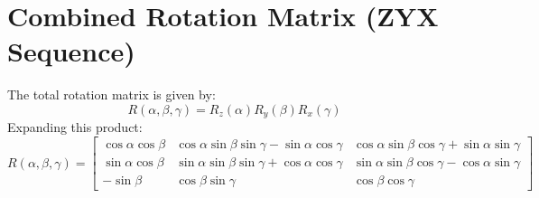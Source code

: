 \documentclass{article}
\begin{document}
\section{Combined Rotation Matrix (ZYX Sequence)}
The total rotation matrix is given by:
\begin{equation}
R(\alpha, \beta, \gamma) = R_z(\alpha) R_y(\beta) R_x(\gamma)
\end{equation}
Expanding this product:
\begin{equation}
R(\alpha, \beta, \gamma) =
\begin{bmatrix}
\cos\alpha \cos\beta & \cos\alpha \sin\beta \sin\gamma - \sin\alpha \cos\gamma & \cos\alpha \sin\beta \cos\gamma + \sin\alpha \sin\gamma \\
\sin\alpha \cos\beta & \sin\alpha \sin\beta \sin\gamma + \cos\alpha \cos\gamma & \sin\alpha \sin\beta \cos\gamma - \cos\alpha \sin\gamma \\
-\sin\beta & \cos\beta \sin\gamma & \cos\beta \cos\gamma
\end{bmatrix}
\end{equation}
\end{document}
